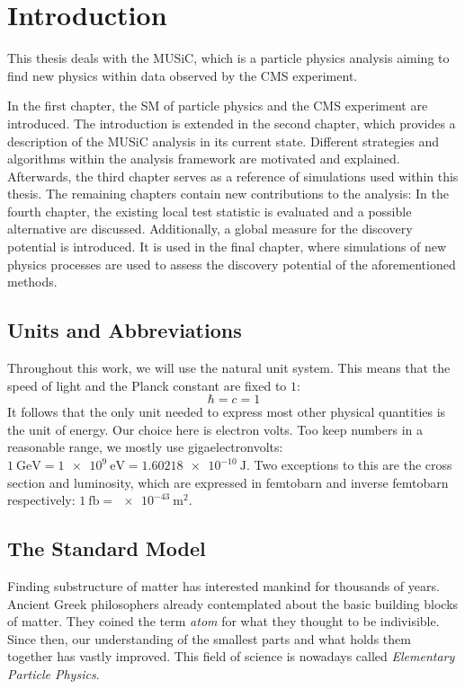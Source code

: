 
\chapter{Introduction}

This thesis deals with the \acf{MUSiC}, which is a particle physics analysis aiming to find new physics within data observed by the \acs{CMS} experiment.

In the first chapter, the \acl{SM} of particle physics and the \acs{CMS} experiment are introduced. 
The introduction is extended in the second chapter, which provides a description of the \acs{MUSiC} analysis in its current state. Different strategies and algorithms within the analysis framework are motivated and explained. Afterwards, the third chapter serves as a reference of simulations used within this thesis. The remaining chapters contain new contributions to the analysis: In the fourth chapter, the existing local test statistic \TS is evaluated and a possible alternative are discussed. Additionally, a global measure for the discovery potential is introduced. It is used in the final chapter, where simulations of new physics processes are used to assess the discovery potential of the aforementioned methods. 

\section{Units and Abbreviations}
Throughout this work, we will use the natural unit system. This means that the speed of light and the Planck constant are fixed to $1$:
\begin{equation*}
    \hbar = c = 1
\end{equation*}
It follows that the only unit needed to express most other physical quantities is the unit of energy. Our choice here is electron volts. Too keep numbers in a reasonable range, we mostly use gigaelectronvolts: $\SI{1}{\giga\eV} = \SI{1e9}{\eV} = \SI{1.60218e-10}{\joule}$.
Two exceptions to this are the cross section and luminosity, which are expressed in femtobarn and inverse femtobarn respectively: $\SI{1}{\femto\barn} = \SI{e-43}{\meter\squared}$.

\section{The Standard Model}
Finding substructure of matter has interested mankind for thousands of years. Ancient Greek philosophers already contemplated about the basic building blocks of matter\cite{Melsen:atomosatomhistory}. They coined the term \emph{atom} for what they thought to be indivisible. Since then, our understanding of the smallest parts and what holds them together has vastly improved. This field of science is nowadays called \emph{Elementary Particle Physics}. 

